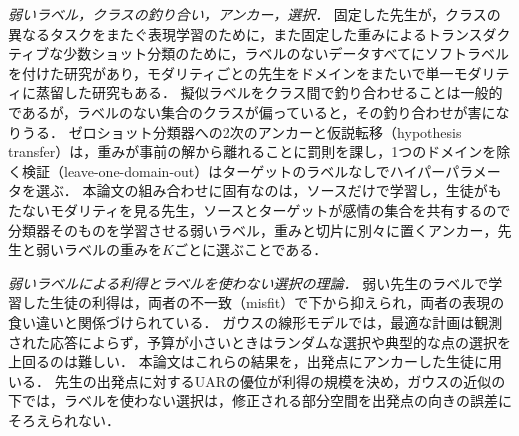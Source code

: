 \emph{弱いラベル，クラスの釣り合い，アンカー，選択．}
固定した先生が，クラスの異なるタスクをまたぐ表現学習のために\cite{phoo2021selftraining}，また固定した重みによるトランスダクティブな少数ショット分類のために\cite{zanella2024boosting}，ラベルのないデータすべてにソフトラベルを付けた研究があり，モダリティごとの先生をドメインをまたいで単一モダリティに蒸留した研究もある\cite{hatano2024multimodal}．
擬似ラベルをクラス間で釣り合わせることは一般的であるが\cite{huang2022unsupervised,xie2020selftraining,hu2021leveraging,berthelot2022adamatch}，ラベルのない集合のクラスが偏っていると，その釣り合わせが害になりうる\cite{veilleux2021realistic}．
ゼロショット分類器への2次のアンカー\cite{silvarodriguez2024closer}と仮説転移（hypothesis transfer）\cite{kuzborskij2017fast,li2018explicit}は，重みが事前の解から離れることに罰則を課し，1つのドメインを除く検証（leave-one-domain-out）はターゲットのラベルなしでハイパーパラメータを選ぶ\cite{gulrajani2021domainbed}．
本論文の組み合わせに固有なのは，ソースだけで学習し，生徒がもたないモダリティを見る先生，ソースとターゲットが感情の集合を共有するので分類器そのものを学習させる弱いラベル，重みと切片に別々に置くアンカー，先生と弱いラベルの重みを$K$ごとに選ぶことである．

\emph{弱いラベルによる利得とラベルを使わない選択の理論．}
弱い先生のラベルで学習した生徒の利得は，両者の不一致（misfit）で下から抑えられ\cite{charikar2024quantifying}，両者の表現の食い違いと関係づけられている\cite{dong2025discrepancies,xue2025representations}．
ガウスの線形モデルでは，最適な計画は観測された応答によらず\cite{chaloner1984optimal,chaloner1995bayesian}，予算が小さいときはランダムな選択や典型的な点の選択を上回るのは難しい\cite{hacohen2022active}．
本論文はこれらの結果を，出発点にアンカーした生徒に用いる．
先生の出発点に対するUARの優位が利得の規模を決め，ガウスの近似の下では，ラベルを使わない選択は，修正される部分空間を出発点の向きの誤差にそろえられない．

